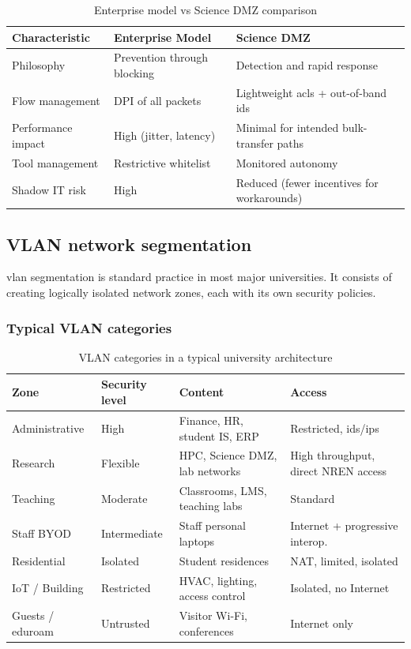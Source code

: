 \begin{table}[H]
\centering
\caption{Enterprise model vs Science DMZ comparison}
\label{tab:enterprise-vs-sdmz}
\small
\begin{tabularx}{\textwidth}{l X X}
\toprule
\textbf{Characteristic} & \textbf{Enterprise Model} &
    \textbf{Science DMZ} \\
\midrule
Philosophy & Prevention through blocking & Detection and rapid response \\
\addlinespace
Flow management & DPI of all packets & Lightweight \gls{acl}s + out-of-band \gls{ids} \\
\addlinespace
Performance impact & High (jitter, latency) & Minimal for intended bulk-transfer paths \\
\addlinespace
Tool management & Restrictive whitelist & Monitored autonomy \\
\addlinespace
Shadow IT risk & High & Reduced (fewer incentives for workarounds) \\
\bottomrule
\end{tabularx}
\end{table}

\subsection{VLAN network segmentation}
\label{subsec:vlan}

\gls{vlan} segmentation is standard practice in most major universities. It
consists of creating logically isolated network zones, each with its own
security policies.

\subsubsection{Typical VLAN categories}

\begin{table}[H]
\centering
\caption{VLAN categories in a typical university architecture}
\label{tab:vlans}
\small
\begin{tabularx}{\textwidth}{l l X l}
\toprule
\textbf{Zone} & \textbf{Security level} & \textbf{Content} & \textbf{Access} \\
\midrule
Administrative & High & Finance, HR, student IS, ERP &
    Restricted, \gls{ids}/\gls{ips} \\
\addlinespace
Research & Flexible & HPC, Science DMZ, lab networks &
    High throughput, direct NREN access \\
\addlinespace
Teaching & Moderate & Classrooms, LMS, teaching labs &
    Standard \\
\addlinespace
Staff BYOD & Intermediate & Staff personal laptops &
    Internet + progressive interop. \\
\addlinespace
Residential & Isolated & Student residences &
    NAT, limited, isolated \\
\addlinespace
IoT / Building & Restricted & HVAC, lighting, access control &
    Isolated, no Internet \\
\addlinespace
Guests / eduroam & Untrusted & Visitor Wi-Fi, conferences &
    Internet only \\
\bottomrule
\end{tabularx}
\end{table}

